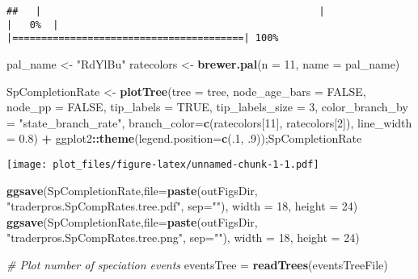 \documentclass[
]{article}
\newenvironment{Shaded}{\begin{snugshade}}{\end{snugshade}}
\newcommand{\AttributeTok}[1]{\textcolor[rgb]{0.13,0.29,0.53}{#1}}
\newcommand{\CommentTok}[1]{\textcolor[rgb]{0.56,0.35,0.01}{\textit{#1}}}
\newcommand{\ConstantTok}[1]{\textcolor[rgb]{0.56,0.35,0.01}{#1}}
\newcommand{\DecValTok}[1]{\textcolor[rgb]{0.00,0.00,0.81}{#1}}
\newcommand{\FloatTok}[1]{\textcolor[rgb]{0.00,0.00,0.81}{#1}}
\newcommand{\FunctionTok}[1]{\textcolor[rgb]{0.13,0.29,0.53}{\textbf{#1}}}
\newcommand{\NormalTok}[1]{#1}
\newcommand{\OtherTok}[1]{\textcolor[rgb]{0.56,0.35,0.01}{#1}}
\newcommand{\SpecialCharTok}[1]{\textcolor[rgb]{0.81,0.36,0.00}{\textbf{#1}}}
\newcommand{\StringTok}[1]{\textcolor[rgb]{0.31,0.60,0.02}{#1}}
\begin{document}
\begin{verbatim}
##   |                                                |                                        |   0%  |                                                |========================================| 100%
\end{verbatim}

\begin{Shaded}
\begin{Highlighting}[]
\NormalTok{pal\_name }\OtherTok{\textless{}{-}} \StringTok{"RdYlBu"}
\NormalTok{ratecolors }\OtherTok{\textless{}{-}} \FunctionTok{brewer.pal}\NormalTok{(}\AttributeTok{n =} \DecValTok{11}\NormalTok{, }\AttributeTok{name =}\NormalTok{ pal\_name)}

\NormalTok{SpCompletionRate }\OtherTok{\textless{}{-}} \FunctionTok{plotTree}\NormalTok{(}\AttributeTok{tree =}\NormalTok{ tree, }
                   \AttributeTok{node\_age\_bars =} \ConstantTok{FALSE}\NormalTok{,}
                   \AttributeTok{node\_pp =} \ConstantTok{FALSE}\NormalTok{, }
                   \AttributeTok{tip\_labels =} \ConstantTok{TRUE}\NormalTok{,}
                   \AttributeTok{tip\_labels\_size =} \DecValTok{3}\NormalTok{,}
                   \AttributeTok{color\_branch\_by =} \StringTok{"state\_branch\_rate"}\NormalTok{,}
                   \AttributeTok{branch\_color=}\FunctionTok{c}\NormalTok{(ratecolors[}\DecValTok{11}\NormalTok{], ratecolors[}\DecValTok{2}\NormalTok{]),}
                   \AttributeTok{line\_width =} \FloatTok{0.8}\NormalTok{) }\SpecialCharTok{+} 
\NormalTok{  ggplot2}\SpecialCharTok{::}\FunctionTok{theme}\NormalTok{(}\AttributeTok{legend.position=}\FunctionTok{c}\NormalTok{(.}\DecValTok{1}\NormalTok{, .}\DecValTok{9}\NormalTok{));SpCompletionRate}
\end{Highlighting}
\end{Shaded}

\texttt{[image: plot\_files/figure-latex/unnamed-chunk-1-1.pdf]}

\begin{Shaded}
\begin{Highlighting}[]
\FunctionTok{ggsave}\NormalTok{(SpCompletionRate,}\AttributeTok{file=}\FunctionTok{paste}\NormalTok{(outFigsDir, }\StringTok{"traderpros.SpCompRates.tree.pdf"}\NormalTok{, }\AttributeTok{sep=}\StringTok{""}\NormalTok{), }\AttributeTok{width =} \DecValTok{18}\NormalTok{, }\AttributeTok{height =} \DecValTok{24}\NormalTok{) }
\FunctionTok{ggsave}\NormalTok{(SpCompletionRate,}\AttributeTok{file=}\FunctionTok{paste}\NormalTok{(outFigsDir, }\StringTok{"traderpros.SpCompRates.tree.png"}\NormalTok{, }\AttributeTok{sep=}\StringTok{""}\NormalTok{), }\AttributeTok{width =} \DecValTok{18}\NormalTok{, }\AttributeTok{height =} \DecValTok{24}\NormalTok{) }


\CommentTok{\# Plot number of speciation events}
\NormalTok{eventsTree }\OtherTok{=} \FunctionTok{readTrees}\NormalTok{(eventsTreeFile)}
\end{Highlighting}
\end{Shaded}
\end{document}
